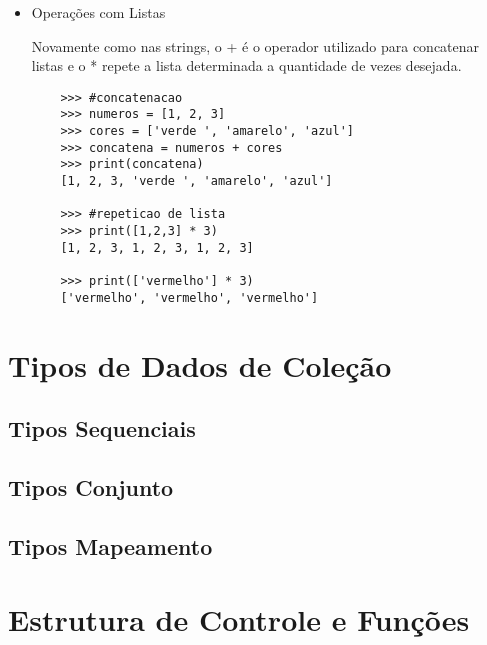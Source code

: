 	\begin{itemize}
	\item {Operações com Listas}
	
	Novamente como nas strings, o + é o operador utilizado para concatenar listas e o * repete a lista determinada a quantidade de vezes desejada.
	
	\begin{lstlisting}
	>>> #concatenacao
	>>> numeros = [1, 2, 3]
	>>> cores = ['verde ', 'amarelo', 'azul']
	>>> concatena = numeros + cores
	>>> print(concatena)
	[1, 2, 3, 'verde ', 'amarelo', 'azul']
	
	>>> #repeticao de lista
	>>> print([1,2,3] * 3)
	[1, 2, 3, 1, 2, 3, 1, 2, 3]
	
	>>> print(['vermelho'] * 3)
	['vermelho', 'vermelho', 'vermelho']
	\end{lstlisting}

	\end{itemize}
    \section{Tipos de Dados de Coleção}


            \subsection{Tipos Sequenciais}


            \subsection{Tipos Conjunto}


            \subsection{Tipos Mapeamento}




    \section{Estrutura de Controle e Funções}


